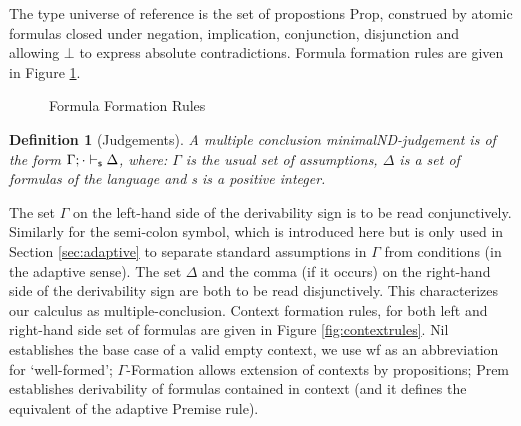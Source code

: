 \documentclass[]{article}
\newtheorem{definition}{Definition}
\begin{document}
%
The type universe of reference is the set of propostions {\sf Prop}, construed by atomic formulas closed under negation, implication, conjunction, disjunction and allowing $\bot$ to express absolute contradictions. Formula formation rules are given in Figure \ref{fig:formulaconstructions}. 

\begin{figure}[h!]
\caption{Formula Formation Rules}\label{fig:formulaconstructions}
\end{figure}



\begin{definition}[Judgements]
A multiple conclusion {\sf minimalND}-judgement is of the form $\Gamma;\cdot \vdash_{\sf s} \Delta$, where: $\Gamma$ is the usual set of assumptions, $\Delta$ is a set of formulas of the language and {\sf s} is a positive integer.
\end{definition}
The set $\Gamma$ on the left-hand side of the derivability sign is to be read conjunctively. Similarly for the semi-colon symbol, which is introduced here but is only used in Section \ref{sec:adaptive} to separate standard assumptions in $\Gamma$ from conditions (in the adaptive sense). The set $\Delta$ and the comma (if it occurs) on the right-hand side of the derivability sign are both to be read disjunctively. This characterizes our calculus as multiple-conclusion. Context formation rules, for both left and right-hand side set of formulas are given in Figure \ref{fig:contextrules}. {\sf Nil} establishes the base case of a valid empty context, we use {\sf wf} as an abbreviation for `well-formed'; $\Gamma${\sf -Formation} allows extension of contexts by propositions; {\sf Prem} establishes derivability of formulas contained in context (and it defines the equivalent of the adaptive Premise rule).
\end{document}
